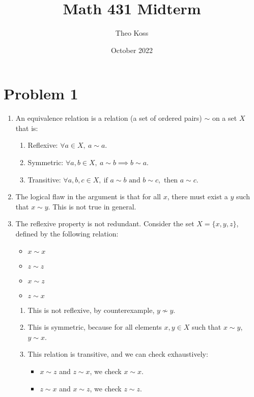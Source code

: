\documentclass[a4paper,12pt]{extarticle}
\title{Math 431 Midterm}
\author{Theo Koss}
\date{October 2022}
\theoremstyle{definition}
\begin{document}
    \maketitle
    \section*{Problem 1}\begin{enumerate}[label=(\alph*)]
        \item An equivalence relation is a relation (a set of ordered pairs) $\sim$ on a set $X$ that is: \begin{enumerate}[label=\roman*.]
            \item Reflexive: $\forall a\in X,\ a\sim a$.
            \item Symmetric: $\forall a,b\in X,\ a\sim b\implies b\sim a$.
            \item Transitive: $\forall a,b,c\in X,\ \text{if }a\sim b\text{ and }b\sim c,\text{ then }a\sim c$.
        \end{enumerate}
        \item The logical flaw in the argument is that for all $x$, there must exist a $y$ such that $x\sim y$. This is not true in general.
        \item The reflexive property is not redundant. Consider the set $X=\{x,y,z\}$, defined by the following relation:\begin{itemize}
            \item $x\sim x$
            \item $z\sim z$
            \item $x\sim z$
            \item $z\sim x$
        \end{itemize}
        \begin{enumerate}[label=\roman*.]
            \item This is not reflexive, by counterexample, $y\not\sim y$.
            \item This is symmetric, because for all elements $x,y\in X$ such that $x\sim y$, $y\sim x$.
            \item This relation is transitive, and we can check exhaustively:\begin{itemize}
                \item $x\sim z$ and $z\sim x$, we check $x\sim x$. \checkmark
                \item $z\sim x$ and $x\sim z$, we check $z\sim z$. \checkmark
            \end{itemize}
        \end{enumerate}
    \end{enumerate}
\end{document}
